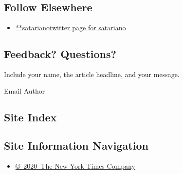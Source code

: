 \hypertarget{follow-elsewhere}{%
\subsection{Follow Elsewhere}\label{follow-elsewhere}}

\begin{itemize}
\tightlist
\item
  \href{https://twitter.com/satariano}{**satarianotwitter page for
  satariano}
\end{itemize}

\hypertarget{feedback-questions}{%
\subsection{Feedback? Questions?}\label{feedback-questions}}

Include your name, the article headline, and your message.

Email Author

\hypertarget{site-index}{%
\subsection{Site Index}\label{site-index}}

\hypertarget{site-information-navigation}{%
\subsection{Site Information
Navigation}\label{site-information-navigation}}

\begin{itemize}
\tightlist
\item
  \href{https://help.nytimes.com/hc/en-us/articles/115014792127-Copyright-notice}{©~2020~The
  New York Times Company}
\end{itemize}

